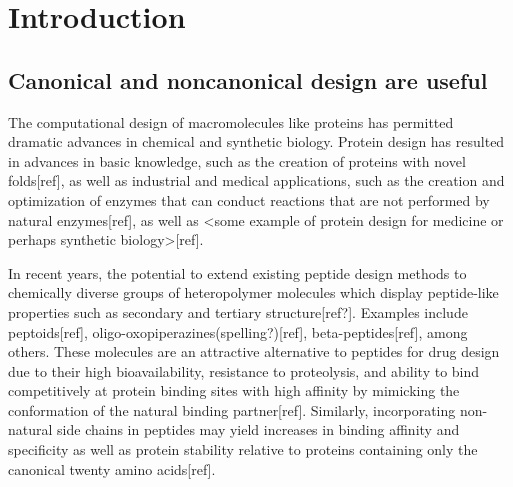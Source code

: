 \section{Introduction}
\subsection{Canonical and noncanonical design are useful}
The computational design of macromolecules like proteins has permitted dramatic advances in chemical and synthetic biology.
Protein design has resulted in advances in basic knowledge, such as the creation of proteins with novel folds[ref], as well as industrial and medical applications, such as the creation and optimization of enzymes that can conduct reactions that are not performed by natural enzymes[ref], as well as <some example of protein design for medicine or perhaps synthetic biology>[ref].

In recent years, the potential to extend existing peptide design methods to chemically diverse groups of heteropolymer molecules which display peptide-like properties such as secondary and tertiary structure[ref?]. Examples include peptoids[ref], oligo-oxopiperazines(spelling?)[ref], beta-peptides[ref], among others. These molecules are an attractive alternative to peptides for drug design due to their high bioavailability, resistance to proteolysis, and ability to bind competitively at protein binding sites with high affinity by mimicking the conformation of the natural binding partner[ref]. Similarly, incorporating non-natural side chains in peptides may yield increases in binding affinity and specificity as well as protein stability relative to proteins containing only the canonical twenty amino acids[ref].

